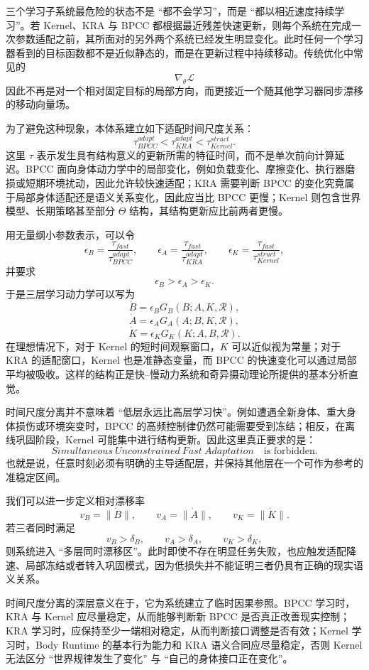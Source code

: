 三个学习子系统最危险的状态不是 ``都不会学习''，而是 ``都以相近速度持续学习''。若 Kernel、KRA 与 BPCC 都根据最近残差快速更新，则每个系统在完成一次参数适配之前，其所面对的另外两个系统已经发生明显变化。此时任何一个学习器看到的目标函数都不是近似静态的，而是在更新过程中持续移动。传统优化中常见的
\[
\nabla_{\theta}\mathcal{L}
\]
因此不再是对一个相对固定目标的局部方向，而更接近一个随其他学习器同步漂移的移动向量场。

为了避免这种现象，本体系建立如下适配时间尺度关系：
\[
\boxed{
\tau_{BPCC}^{adapt}
<
\tau_{KRA}^{adapt}
<
\tau_{Kernel}^{struct}.
}
\]
这里 $\tau$ 表示发生具有结构意义的更新所需的特征时间，而不是单次前向计算延迟。BPCC 面向身体动力学中的局部变化，例如负载变化、摩擦变化、执行器磨损或短期环境扰动，因此允许较快速适配；KRA 需要判断 BPCC 的变化究竟属于局部身体适配还是语义关系变化，因此应当比 BPCC 更慢；Kernel 则包含世界模型、长期策略甚至部分 $\Theta$ 结构，其结构更新应比前两者更慢。

用无量纲小参数表示，可以令
\[
\epsilon_B
=
\frac{\tau_{fast}}{\tau_{BPCC}^{adapt}},
\qquad
\epsilon_A
=
\frac{\tau_{fast}}{\tau_{KRA}^{adapt}},
\qquad
\epsilon_K
=
\frac{\tau_{fast}}{\tau_{Kernel}^{struct}},
\]
并要求
\[
\epsilon_B
>
\epsilon_A
>
\epsilon_K.
\]
于是三层学习动力学可以写为
\[
\dot B
=
\epsilon_B
G_B(B;A,K,\mathcal R),
\]
\[
\dot A
=
\epsilon_A
G_A(A;B,K,\mathcal R),
\]
\[
\dot K
=
\epsilon_K
G_K(K;A,B,\mathcal R).
\]
在理想情况下，对于 Kernel 的短时间观察窗口，$K$ 可以近似视为常量；对于 KRA 的适配窗口，Kernel 也是准静态变量，而 BPCC 的快速变化可以通过局部平均被吸收。这样的结构正是快--慢动力系统和奇异摄动理论所提供的基本分析直觉。

时间尺度分离并不意味着 ``低层永远比高层学习快''。例如遭遇全新身体、重大身体损伤或环境突变时，BPCC 的高频控制律仍然可能需要受到冻结；相反，在离线巩固阶段，Kernel 可能集中进行结构更新。因此这里真正要求的是：
\[
\boxed{
Simultaneous\ Unconstrained\ Fast\ Adaptation
\quad
\text{is forbidden}.
}
\]
也就是说，任意时刻必须有明确的主导适配层，并保持其他层在一个可作为参考的准稳定区间。

我们可以进一步定义相对漂移率
\[
v_B=\|\dot B\|,
\qquad
v_A=\|\dot A\|,
\qquad
v_K=\|\dot K\|.
\]
若三者同时满足
\[
v_B>\delta_B,
\qquad
v_A>\delta_A,
\qquad
v_K>\delta_K,
\]
则系统进入 ``多层同时漂移区''。此时即使不存在明显任务失败，也应触发适配降速、局部冻结或者转入巩固模式，因为低损失并不能证明三者仍具有正确的现实语义关系。

时间尺度分离的深层意义在于，它为系统建立了临时因果参照。BPCC 学习时，KRA 与 Kernel 应尽量稳定，从而能够判断新 BPCC 是否真正改善现实控制；KRA 学习时，应保持至少一端相对稳定，从而判断接口调整是否有效；Kernel 学习时，Body Runtime 的基本行为能力和 KRA 语义合同应尽量稳定，否则 Kernel 无法区分 ``世界规律发生了变化'' 与 ``自己的身体接口正在变化''。


